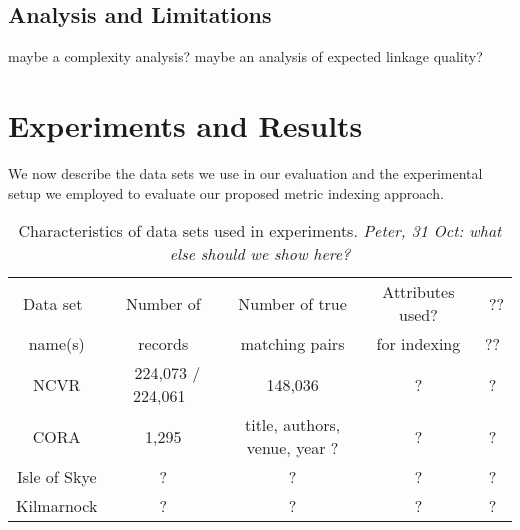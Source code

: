 \documentclass{llncs}
\begin{document}








\subsection{Analysis and Limitations}
\label{sec-analysis}

maybe a complexity analysis? maybe an analysis of expected 
linkage quality?


\section{Experiments and Results}
\label{sec-data}

We now describe the data sets we use in our evaluation and the
experimental setup we employed to evaluate our proposed metric
indexing approach.




\begin{table}[t]
\caption{Characteristics of data sets used in experiments.
  \emph{Peter, 31 Oct: what else should we show here?}}
 \label{table-datasets}
  \centering
  \begin{scriptsize}
  \begin{tabular}{ccccc}
  \hline\noalign{\smallskip}
  Data set~ & ~Number of~ & ~Number of true~
   & Attributes used? & ~?? \\
  name(s)  & records   & matching pairs &
    for indexing & ?? \\
  \noalign{\smallskip}
  \hline
  \noalign{\smallskip}
  NCVR  & ~224,073 / 224,061~ & ~148,036~ & ? & ? \\
  CORA  & 1,295             & title, authors, venue, year ? & ?
    & ? \\
  Isle of Skye & ? & ?
    & ? & ? \\
  Kilmarnock  & ? & ? & ? & ? \\
  \hline
  \end{tabular}
  \end{scriptsize}
\end{table}
\end{document}
